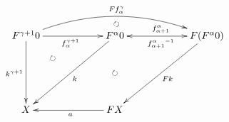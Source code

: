 \documentclass[12pt]{article}
\begin{document}
\pagestyle{empty}

\begin{align*}
  \vcenter{
    \xymatrix@=60pt{
      F^{\gamma + 1} 0
      \ar@{->}[r]_{f^{\gamma + 1}_\alpha}
      \ar@/^20pt/@{->}[rr]^{F f^\gamma_\alpha}
      \ar@/^12pt/@{{}{ }{}}[rr]|{\circlearrowright}
      \ar@{->}[d]_{k^{\gamma + 1}}
      \ar@{{}{ }{}}[rd]|(.3){\circlearrowright}
      &
      F^\alpha 0
      \ar@{<->}[r]^{f^\alpha_{\alpha + 1}}_{{f^\alpha_{\alpha + 1}}^{-1}}
      \ar@{->}[ld]^k
      \ar@{{}{ }{}}[d]|{\circlearrowright}
      &
      F (F^\alpha 0)
      \ar@{->}[ld]^{F k}
      \\
      X
      &
      F X
      \ar@{->}[l]^a
    }
  }
\end{align*}
\end{document}
